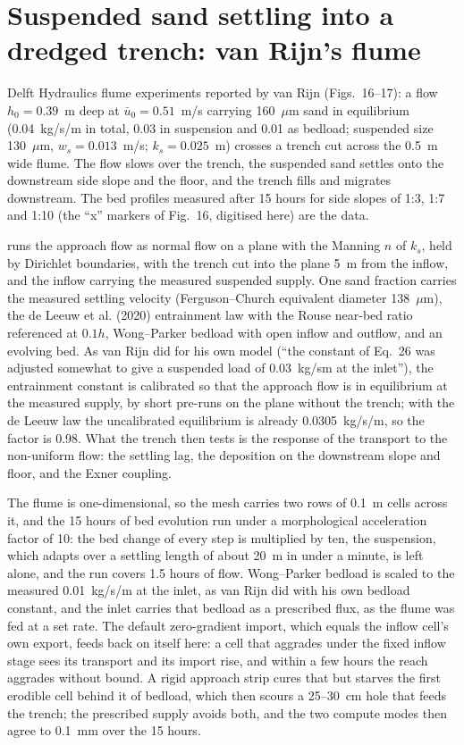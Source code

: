 
\section{Suspended sand settling into a dredged trench: van Rijn's flume}

Delft Hydraulics flume experiments reported by van Rijn \cite{vanRijn1986b}
(Figs.~16--17): a flow $h_0 = 0.39$~m deep at $\bar u_0 = 0.51$~m/s carrying
160~$\mu$m sand in equilibrium (0.04~kg/s/m in total, 0.03 in suspension and
0.01 as bedload; suspended size 130~$\mu$m, $w_s = 0.013$~m/s; $k_s = 0.025$~m)
crosses a trench cut across the 0.5~m wide flume. The flow slows over the
trench, the suspended sand settles onto the downstream side slope and the
floor, and the trench fills and migrates downstream. The bed profiles
measured after 15 hours for side slopes of 1:3, 1:7 and 1:10 (the ``x''
markers of Fig.~16, digitised here) are the data.

\anuga{} runs the approach flow as normal flow on a plane with the Manning
$n$ of $k_s$, held by Dirichlet boundaries, with the trench cut into the
plane 5~m from the inflow, and the inflow carrying the measured suspended
supply. One sand fraction carries the measured settling velocity
(Ferguson--Church equivalent diameter 138~$\mu$m), the de Leeuw et al.
(2020) entrainment law with the Rouse near-bed ratio referenced at $0.1h$,
Wong--Parker bedload with open inflow and outflow, and an evolving bed. As
van Rijn did for his own model (``the constant of Eq.~26 was adjusted
somewhat to give a suspended load of 0.03~kg/sm at the inlet''), the
entrainment constant is calibrated so that the approach flow is in
equilibrium at the measured supply, by short pre-runs on the plane without
the trench; with the de Leeuw law the uncalibrated equilibrium is already
0.0305~kg/s/m, so the factor is 0.98. What the trench then tests is the
response of the transport to the non-uniform flow: the settling lag, the
deposition on the downstream slope and floor, and the Exner coupling.

The flume is one-dimensional, so the mesh carries two rows of 0.1~m cells
across it, and the 15 hours of bed evolution run under a morphological
acceleration factor of 10: the bed change of every step is multiplied by
ten, the suspension, which adapts over a settling length of about 20~m in
under a minute, is left alone, and the run covers 1.5 hours of flow.
Wong--Parker bedload is scaled to the measured 0.01~kg/s/m at the inlet,
as van Rijn did with his own bedload constant, and the inlet carries that
bedload as a prescribed flux, as the flume was fed at a set rate. The
default zero-gradient import, which equals the inflow cell's own export,
feeds back on itself here: a cell that aggrades under the fixed inflow
stage sees its transport and its import rise, and within a few hours the
reach aggrades without bound. A rigid approach strip cures that but starves
the first erodible cell behind it of bedload, which then scours a 25--30~cm
hole that feeds the trench; the prescribed supply avoids both, and the two
compute modes then agree to 0.1~mm over the 15 hours.


